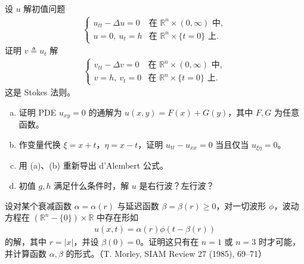 \documentclass[../../main.tex]{subfiles}
\begin{document}
\begin{exercise}\label{exercise:ch02-18}
设 $u$ 解初值问题
\begin{align*}
\begin{cases}
u_{tt}-\Delta u=0 & \text{在 }\mathbb{R}^n\times(0,\infty)\text{ 中},\\
u=0,\ u_t=h & \text{在 }\mathbb{R}^n\times\{t=0\}\text{ 上}.
\end{cases}
\end{align*}
证明 $v\triangleq u_t$ 解
\begin{align*}
\begin{cases}
v_{tt}-\Delta v=0 & \text{在 }\mathbb{R}^n\times(0,\infty)\text{ 中},\\
v=h,\ v_t=0 & \text{在 }\mathbb{R}^n\times\{t=0\}\text{ 上}.
\end{cases}
\end{align*}
这是 Stokes 法则。
\end{exercise}

\begin{exercise}\label{exercise:ch02-19}
\begin{enumerate}[(a)]
\item 证明 PDE $u_{xy}=0$ 的通解为 $u(x,y)=F(x)+G(y)$，其中 $F,G$ 为任意函数。
\item 作变量代换 $\xi=x+t$，$\eta=x-t$，证明 $u_{tt}-u_{xx}=0$ 当且仅当 $u_{\xi\eta}=0$。
\item 用 (a)、(b) 重新导出 d'Alembert 公式。
\item 初值 $g,h$ 满足什么条件时，解 $u$ 是右行波？左行波？
\end{enumerate}
\end{exercise}

\begin{exercise}\label{exercise:ch02-20}
设对某个衰减函数 $\alpha=\alpha(r)$ 与延迟函数 $\beta=\beta(r)\geqslant 0$，对一切波形 $\phi$，波动方程在 $(\mathbb{R}^n-\{0\})\times\mathbb{R}$ 中存在形如
\begin{align*}
u(x,t)=\alpha(r)\phi(t-\beta(r))
\end{align*}
的解，其中 $r=|x|$，并设 $\beta(0)=0$。证明这只有在 $n=1$ 或 $n=3$ 时才可能，并计算函数 $\alpha,\beta$ 的形式。（T. Morley, SIAM Review 27 (1985), 69--71）
\end{exercise}
\end{document}
